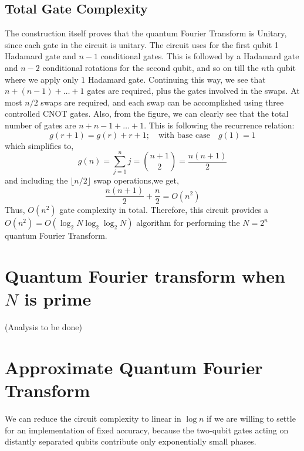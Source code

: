 \subsection{Total Gate Complexity}The construction itself proves that the quantum Fourier Transform is Unitary, since each gate in the circuit is unitary. The circuit uses for the first qubit 1 Hadamard gate and $n-1$ conditional gates. This is followed by a Hadamard gate and $n-2$ conditional rotations for the second qubit, and so on till the $n$th qubit where we apply only $1$ Hadamard gate. Continuing this way, we see that $n+(n-1)+\ldots + 1$ gates are required, plus the gates involved in the swaps. At most $n/2$ swaps are required, and each swap can be accomplished using three controlled CNOT gates. Also, from the figure, we can clearly see that the total number of gates are $n+n-1+\ldots +1$. This is following the recurrence relation:
\[
g(r+1)=g(r)+r+1;\quad \text{with base case} \quad g(1)=1
\]
which simplifies to,
\[
g(n) = \sum_{j=1}^n j =\binom{n+1}{2}=\frac{n(n+1)}{2}
\]
and including the $\lfloor n/2\rfloor$ swap operations,we get,
\[
\frac{n(n+1)}{2} +\frac{n}{2}=O(n^2)
\]
Thus, $O(n^2)$ gate complexity in total. Therefore, this circuit provides a $O(n^2)=O(\log_2 N \log_2 \log_2N)$ algorithm for performing the $N=2^n$ quantum Fourier Transform.
\section{Quantum Fourier transform when $N$ is prime}
(Analysis to be done)

\section{Approximate Quantum Fourier Transform}
We can reduce the circuit complexity to linear in $\log n$ if we are willing to settle for an implementation of fixed accuracy, because the two-qubit gates acting on distantly separated qubits contribute only exponentially small phases.

